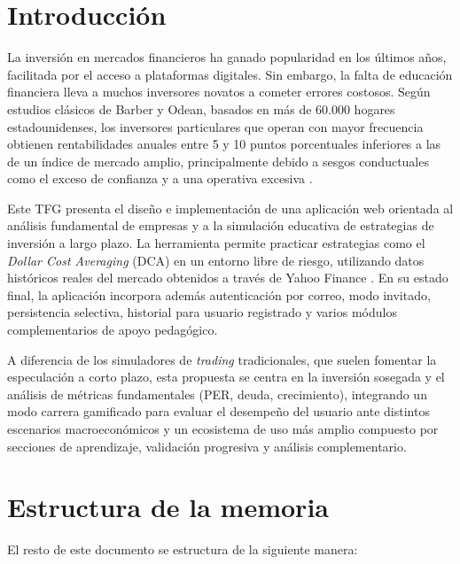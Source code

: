 
\section{Introducción}

La inversión en mercados financieros ha ganado popularidad en los últimos años, facilitada por el acceso a plataformas digitales. Sin embargo, la falta de educación financiera lleva a muchos inversores novatos a cometer errores costosos. Según estudios clásicos de Barber y Odean, basados en más de 60.000 hogares estadounidenses, los inversores particulares que operan con mayor frecuencia obtienen rentabilidades anuales entre 5 y 10 puntos porcentuales inferiores a las de un índice de mercado amplio, principalmente debido a sesgos conductuales como el exceso de confianza y a una operativa excesiva \cite{barber2000trading}.

Este TFG presenta el diseño e implementación de una aplicación web orientada al análisis fundamental de empresas y a la simulación educativa de estrategias de inversión a largo plazo. La herramienta permite practicar estrategias como el \textit{Dollar Cost Averaging} (DCA) en un entorno libre de riesgo, utilizando datos históricos reales del mercado obtenidos a través de Yahoo Finance \cite{yfinance}. En su estado final, la aplicación incorpora además autenticación por correo, modo invitado, persistencia selectiva, historial para usuario registrado y varios módulos complementarios de apoyo pedagógico.

A diferencia de los simuladores de \textit{trading} tradicionales, que suelen fomentar la especulación a corto plazo, esta propuesta se centra en la inversión sosegada y el análisis de métricas fundamentales (PER, deuda, crecimiento), integrando un modo carrera gamificado para evaluar el desempeño del usuario ante distintos escenarios macroeconómicos y un ecosistema de uso más amplio compuesto por secciones de aprendizaje, validación progresiva y análisis complementario.

\section{Estructura de la memoria}

El resto de este documento se estructura de la siguiente manera:

